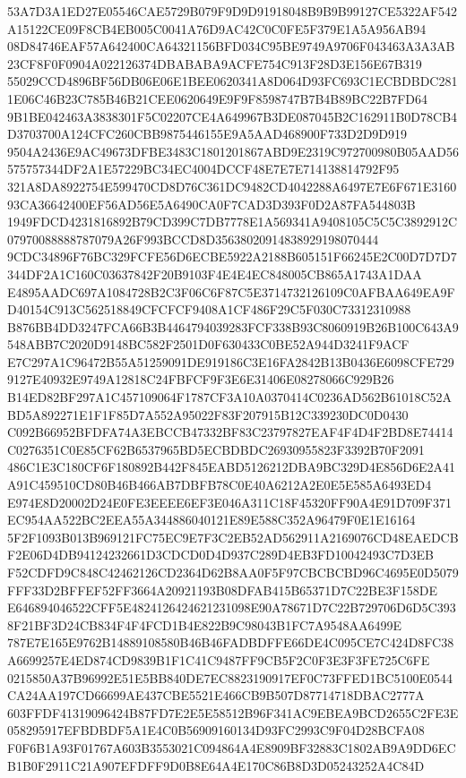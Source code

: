 \documentclass[UTF8,fontset=fandol,zihao=-4,a4paper]{ctexart}
\begin{document}
{{53A7D3A1ED27E05546CAE5729B079F9D9D91918048B9B9B99127CE5322AF542A15122CE09F8CB4EB005C0041A76D9AC42C0C0FE5F379E1A5A956AB94
08D84746EAF57A642400CA64321156BFD034C95BE9749A9706F043463A3A3AB23CF8F0F0904A022126374DBABABA9ACFE754C913F28D3E156E67B319
55029CCD4896BF56DB06E06E1BEE0620341A8D064D93FC693C1ECBDBDC2811E06C46B23C785B46B21CEE0620649E9F9F8598747B7B4B89BC22B7FD64
9B1BE042463A3838301F5C02207CE4A649967B3DE087045B2C162911B0D78CB4D3703700A124CFC260CBB9875446155E9A5AAD468900F733D2D9D919
9504A2436E9AC49673DFBE3483C1801201867ABD9E2319C972700980B05AAD56575757344DF2A1E57229BC34EC4004DCCF48E7E7E714138814792F95
321A8DA8922754E599470CD8D76C361DC9482CD4042288A6497E7E6F671E316093CA36642400EF56AD56E5A6490CA0F7CAD3D393F0D2A87FA544803B
1949FDCD4231816892B79CD399C7DB7778E1A569341A9408105C5C5C3892912C07970088888787079A26F993BCCD8D35638020914838929198070444
9CDC34896F76BC329FCFE56D6ECBE5922A2188B605151F66245E2C00D7D7D7344DF2A1C160C03637842F20B9103F4E4E4EC848005CB865A1743A1DAA
E4895AADC697A1084728B2C3F06C6F87C5E3714732126109C0AFBAA649EA9FD40154C913C562518849CFCFCF9408A1CF486F29C5F030C73312310988
B876BB4DD3247FCA66B3B4464794039283FCF338B93C8060919B26B100C643A9548ABB7C2020D9148BC582F2501D0F630433C0BE52A944D3241F9ACF
E7C297A1C96472B55A51259091DE919186C3E16FA2842B13B0436E6098CFE7299127E40932E9749A12818C24FBFCF9F3E6E31406E08278066C929B26
B14ED82BF297A1C457109064F1787CF3A10A0370414C0236AD562B61018C52ABD5A892271E1F1F85D7A552A95022F83F207915B12C339230DC0D0430
C092B66952BFDFA74A3EBCCB47332BF83C23797827EAF4F4D4F2BD8E74414C0276351C0E85CF62B6537965BD5ECBDBDC26930955823F3392B70F2091
486C1E3C180CF6F180892B442F845EABD5126212DBA9BC329D4E856D6E2A41A91C459510CD80B46B466AB7DBFB78C0E40A6212A2E0E5E585A6493ED4
E974E8D20002D24E0FE3EEEE6EF3E046A311C18F45320FF90A4E91D709F371EC954AA522BC2EEA55A344886040121E89E588C352A96479F0E1E16164
5F2F1093B013B969121FC75EC9E7F3C2EB52AD562911A2169076CD48EAEDCBF2E06D4DB94124232661D3CDCD0D4D937C289D4EB3FD10042493C7D3EB
F52CDFD9C848C42462126CD2364D62B8AA0F5F97CBCBCBD96C4695E0D5079FFF33D2BFFEF52FF3664A20921193B08DFAB415B65371D7C22BE3F158DE
E646894046522CFF5E4824126424621231098E90A78671D7C22B729706D6D5C3938F21BF3D24CB834F4F4FCD1B4E822B9C98043B1FC7A9548AA6499E
787E7E165E9762B14889108580B46B46FADBDFFE66DE4C095CE7C424D8FC38A6699257E4ED874CD9839B1F1C41C9487FF9CB5F2C0F3E3F3FE725C6FE
0215850A37B96992E51E5BB840DE7EC8823190917EF0C73FFED1BC5100E0544CA24AA197CD66699AE437CBE5521E466CB9B507D87714718DBAC2777A
603FFDF41319096424B87FD7E2E5E58512B96F341AC9EBEA9BCD2655C2FE3E058295917EFBDBDF5A1E4C0B56909160134D93FC2993C9F04D28BCFA08
F0F6B1A93F01767A603B3553021C094864A4E8909BF32883C1802AB9A9DD6ECB1B0F2911C21A907EFDFF9D0B8E64A4E170C86B8D3D05243252A4C84D
}}
\end{document}
